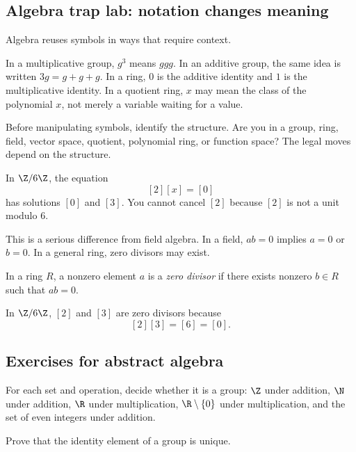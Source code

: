 \subsection{Algebra trap lab: notation changes meaning}

Algebra reuses symbols in ways that require context.

In a multiplicative group, $g^3$ means $ggg$. In an additive group, the same
idea is written $3g=g+g+g$. In a ring, $0$ is the additive identity and $1$ is
the multiplicative identity. In a quotient ring, $x$ may mean the class of the
polynomial $x$, not merely a variable waiting for a value.

\begin{trapbox}
Before manipulating symbols, identify the structure. Are you in a group, ring,
field, vector space, quotient, polynomial ring, or function space? The legal
moves depend on the structure.
\end{trapbox}

\begin{example}
In $\Z/6\Z$, the equation
\[
[2][x]=[0]
\]
has solutions $[0]$ and $[3]$. You cannot cancel $[2]$ because $[2]$ is not a
unit modulo $6$.
\end{example}

This is a serious difference from field algebra. In a field, $ab=0$ implies
$a=0$ or $b=0$. In a general ring, zero divisors may exist.

\begin{definition}
In a ring $R$, a nonzero element $a$ is a \emph{zero divisor} if there exists
nonzero $b\in R$ such that $ab=0$.
\end{definition}

\begin{example}
In $\Z/6\Z$, $[2]$ and $[3]$ are zero divisors because
\[
[2][3]=[6]=[0].
\]
\end{example}

\subsection{Exercises for abstract algebra}

\begin{exercise}
For each set and operation, decide whether it is a group: $\Z$ under addition,
$\N$ under addition, $\R$ under multiplication, $\R\setminus\{0\}$ under
multiplication, and the set of even integers under addition.
\end{exercise}

\begin{exercise}
Prove that the identity element of a group is unique.
\end{exercise}

